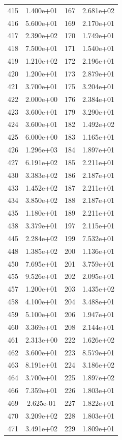 \documentclass[12pt]{article}
\begin{document}
\begin{longtable}{@{}cccc@{}}
415 & 1.400e+01 & 167 & 2.681e+02 \\
416 & 5.600e+01 & 169 & 2.170e+01 \\
417 & 2.390e+02 & 170 & 1.749e+01 \\
418 & 7.500e+01 & 171 & 1.540e+01 \\
419 & 1.210e+02 & 172 & 2.196e+01 \\
420 & 1.200e+01 & 173 & 2.879e+01 \\
421 & 3.700e+01 & 175 & 3.204e+01 \\
422 & 2.000e+00 & 176 & 2.384e+01 \\
423 & 3.600e+01 & 179 & 3.290e+01 \\
424 & 3.600e+01 & 182 & 1.492e+02 \\
425 & 6.000e+00 & 183 & 1.165e+01 \\
426 & 1.296e+03 & 184 & 1.897e+01 \\
427 & 6.191e+02 & 185 & 2.211e+01 \\
430 & 3.383e+02 & 186 & 2.187e+01 \\
433 & 1.452e+02 & 187 & 2.211e+01 \\
434 & 3.850e+02 & 188 & 2.187e+01 \\
435 & 1.180e+01 & 189 & 2.211e+01 \\
438 & 3.379e+01 & 197 & 2.115e+01 \\
445 & 2.284e+02 & 199 & 7.532e+01 \\
448 & 1.385e+02 & 200 & 1.136e+01 \\
450 & 7.695e+01 & 201 & 3.759e+01 \\
455 & 9.526e+01 & 202 & 2.095e+01 \\
457 & 1.200e+01 & 203 & 1.435e+02 \\
458 & 4.100e+01 & 204 & 3.488e+01 \\
459 & 5.100e+01 & 206 & 1.947e+01 \\
460 & 3.369e+01 & 208 & 2.144e+01 \\
461 & 2.313e+00 & 222 & 1.626e+02 \\
462 & 3.600e+01 & 223 & 8.579e+01 \\
463 & 8.191e+01 & 224 & 3.186e+02 \\
464 & 3.700e+01 & 225 & 1.897e+02 \\
466 & 7.359e+01 & 226 & 1.803e+01 \\
469 & 2.625e-01 & 227 & 1.822e+01 \\
470 & 3.209e+02 & 228 & 1.803e+01 \\
471 & 3.491e+02 & 229 & 1.809e+01 \\

\end{longtable}
\end{document}
